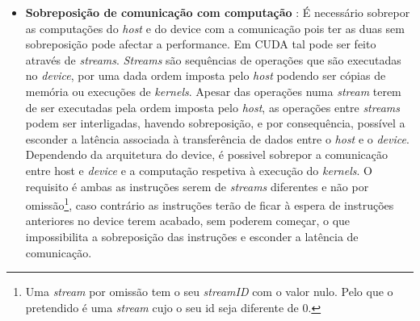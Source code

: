 \begin{itemize}
\item{\textbf{Sobreposição de comunicação com computação}} : 
É necessário sobrepor as computações do \textit{host} e do device com a comunicação pois ter as duas sem sobreposição pode afectar a performance. Em CUDA tal pode ser feito através de \textit{streams}. \textit{Streams} são sequências de operações que são executadas no \textit{device}, por uma dada ordem imposta pelo \textit{host}  podendo ser cópias de memória ou execuções de \textit{kernels}. Apesar das operações numa \textit{stream} terem de ser executadas pela ordem imposta pelo \textit{host}, as operações entre \textit{streams} podem ser interligadas, havendo sobreposição, e por consequência, possível a esconder a latência associada à transferência de dados entre o \textit{host} e o \textit{device}. Dependendo da arquitetura do device, é possivel sobrepor a comunicação entre host e \textit{device} e a computação respetiva à execução do \textit{kernels}. O requisito é ambas as instruções serem de \textit{streams} diferentes e não por omissão\footnote[2]{Uma \textit{stream} por omissão tem o seu \textit{streamID} com o valor nulo. Pelo que o pretendido é uma \textit{stream} cujo o seu id seja diferente de 0. }, caso contrário as instruções terão de ficar à espera de instruções anteriores no device terem acabado, sem poderem começar, o que  impossibilita a sobreposição das instruções e esconder a latência de comunicação.


\end{itemize}
